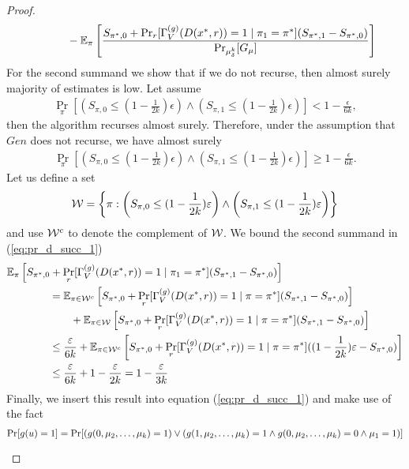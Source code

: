 \begin{proof}
\begin{align}
&\mbox\qquad\qquad - \mathbb{E}_{\pi}\left[\frac{
  S_{\pi^*,0} + \Pr_r [\Gamma_V^{(g)}(D(x^*,r)) = 1 \mid \pi_1 = \pi^*](S_{\pi^*,1} - S_{\pi^*,0})}
{{\Pr}_{\mu_{\delta}^{k}}[G_{\mu}]}\right]
\end{align}
For the second summand we show that if we do not recurse, then almost surely majority of estimates is low.
Let assume
\begin{align}
\underset{\pi}{\Pr}\left[\left(S_{\pi,0} \leq (1 - \frac{1}{2k})\epsilon\right) \land \left( S_{\pi,1} \leq (1-\frac{1}{2k})\epsilon\right)\right] < 1 - \frac{\epsilon}{6k},
\end{align}
then the algorithm recurses almost surely.
Therefore, under the assumption that $Gen$ does not recurse, we have almost surely
\begin{align}
\underset{\pi}{\Pr}\left[\left(S_{\pi,0} \leq (1 - \frac{1}{2k})\epsilon\right) \land \left( S_{\pi,1} \leq (1-\frac{1}{2k})\epsilon\right)\right] \geq 1 - \frac{\epsilon}{6k}.
\end{align}
Let us define a set
\begin{align}
  \mathcal{W} = \left\{ \pi :  \left(S_{\pi,0} \leq (1 - \frac{1}{2k})\varepsilon\right) \land \left( S_{\pi,1} \leq (1-\frac{1}{2k})\varepsilon \right) \right\}
\end{align}
and use $\mathcal{W}^c$ to denote the complement of $\mathcal{W}$.
We bound the second summand in (\ref{eq:pr_d_succ_1})
\begin{align}
&\mathbb{E}_{\pi}\left[ S_{\pi^*,0} + \Pr_r [\Gamma_V^{(g)}(D(x^*,r)) = 1 \mid \pi_1 = \pi^*](S_{\pi^*,1} - S_{\pi^*,0}) \right] \notag\\
&\mbox\qquad\qquad = \mathbb{E}_{\pi \in \mathcal{W}^c}\left[ S_{\pi^*,0} + \Pr_r [\Gamma_V^{(g)}(D(x^*,r)) = 1 \mid \pi = \pi^*](S_{\pi^*,1} - S_{\pi^*,0}) \right] \notag\\
&\mbox\qquad\qquad\qquad +  \mathbb{E}_{\pi \in \mathcal{W}}\left[ S_{\pi^*,0} + \Pr_r [\Gamma_V^{(g)}(D(x^*,r)) = 1 \mid \pi = \pi^*](S_{\pi^*,1} - S_{\pi^*,0}) \right] \\
&\mbox\qquad\qquad \leq \frac{\varepsilon}{6k} + \mathbb{E}_{\pi \in \mathcal{W}^c}\left[ S_{\pi^*,0} + \Pr_r [\Gamma_V^{(g)}(D(x^*,r)) = 1 \mid \pi = \pi^*]((1 - \frac{1}{2k})\varepsilon - S_{\pi^*,0}) \right] \\
&\mbox\qquad\qquad \leq \frac{\varepsilon}{6k} + 1 - \frac{\varepsilon}{2k} = 1 - \frac{\varepsilon}{3k}
\end{align}
Finally, we insert this result into equation (\ref{eq:pr_d_succ_1}) and make use of the fact
\begin{align*}
\underset{}{\Pr}[g(u) = 1] &= \underset{}{\Pr}[(g(0, \mu_2, \dots, \mu_k) = 1) \lor ( g(1,\mu_2, \dots, \mu_k) = 1 \land g(0, \mu_2, \dots, \mu_k) = 0 \land \mu_1 = 1)] \notag\\

\end{align*}
\end{proof}
